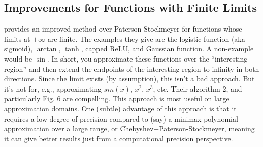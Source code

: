 \documentclass[../fheimpl.tex]{subfiles}
\begin{document}
\subsection{Improvements for Functions with Finite Limits}
\cite{cryptoeprint:2022/280} provides an improved method over Paterson-Stockmeyer for functions whose limits at $\pm\infty$  are finite. The examples they give are the logistic function (aka sigmoid), $\arctan$, $\tanh$, capped ReLU, and Gaussian function. A non-example would be $\sin$. 
In short, you approximate these functions over the ``interesting region'' and then extend the endpoints of the interesting region to infinity in both directions. Since the limit exists (by assumption), this isn't a bad approach. But it's not for, e.g., approximating $sin(x)$, $x^2$, $x^3$, etc. Their algorithm 2, and particularly Fig. 6 are compelling. This approach is most useful on large approximation domains. One (subtle) advantage of this approach is that it requires a low degree of precision compared to (say) a minimax polynomial approximation over a large range, or Chebyshev+Paterson-Stockmeyer, meaning it can give better results just from a computational precision perspective.

\ifcompileasbook
\else
\printbibliography
\fi
\end{document}

